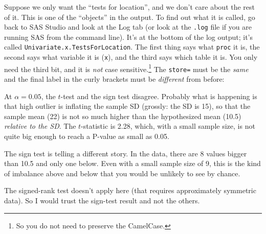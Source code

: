 \documentclass{article}
\begin{document}

Suppose we only want the ``tests for location'', and we don't care
about the rest of it. This is one of the ``objects'' in the output. To
find out what it is called, go back to SAS Studio and look at the Log
tab (or look at the \texttt{.log} file if you are running SAS from the
command line). It's at the bottom of the log output; it's called
\texttt{Univariate.x.TestsForLocation}. The first thing says what
\texttt{proc} it is, the second says what variable it is (\texttt{x}),
and the third says which table it is. You only need the third bit, and
it is \emph{not} case sensitive.\footnote{So you do not need to
  preserve the CamelCase.}
The \texttt{store=} must be the \emph{same} and the final label
in the curly brackets must be \emph{different} from before:


At $\alpha=0.05$, the $t$-test and the sign test disagree. Probably
what is happening is that high outlier is inflating the sample SD
(grossly: the SD is 15), so that the sample mean (22) is not so much
higher than 
the hypothesized mean (10.5) \emph{relative to the SD}. The $t$-statistic is
2.28, which, with a small sample size, is not quite big enough to
reach a P-value as small as 0.05.

The sign test is telling a different story. In the data, there are 8
values bigger than 10.5 and only one below. Even with a small sample
size of 9, this is the kind of imbalance above and below that you would
be unlikely to see by chance.

The signed-rank test doesn't apply here (that requires approximately
symmetric data). So I would trust the sign-test result and not the others.
\end{document}
